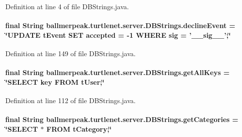Definition at line 4 of file D\-B\-Strings.\-java.

\hypertarget{classballmerpeak_1_1turtlenet_1_1server_1_1DBStrings_a17aab2fc0a6a4f06d268a67e4e7104d4}{
\paragraph[{decline\-Event}]{\setlength{\rightskip}{0pt plus 5cm}final String ballmerpeak.\-turtlenet.\-server.\-D\-B\-Strings.\-decline\-Event = \char`\"{}U\-P\-D\-A\-T\-E t\-Event S\-E\-T accepted = -\/1 W\-H\-E\-R\-E sig = '\-\_\-\-\_\-sig\-\_\-\-\_\-';\char`\"{}\hspace{0.3cm}{\ttfamily [static]}}}\label{classballmerpeak_1_1turtlenet_1_1server_1_1DBStrings_a17aab2fc0a6a4f06d268a67e4e7104d4}


Definition at line 149 of file D\-B\-Strings.\-java.

\hypertarget{classballmerpeak_1_1turtlenet_1_1server_1_1DBStrings_a421524524ae9aecc5f05c4a087a8a3b9}{
\paragraph[{get\-All\-Keys}]{\setlength{\rightskip}{0pt plus 5cm}final String ballmerpeak.\-turtlenet.\-server.\-D\-B\-Strings.\-get\-All\-Keys = \char`\"{}S\-E\-L\-E\-C\-T key F\-R\-O\-M t\-User;\char`\"{}\hspace{0.3cm}{\ttfamily [static]}}}\label{classballmerpeak_1_1turtlenet_1_1server_1_1DBStrings_a421524524ae9aecc5f05c4a087a8a3b9}


Definition at line 112 of file D\-B\-Strings.\-java.

\hypertarget{classballmerpeak_1_1turtlenet_1_1server_1_1DBStrings_abe38c9de113b63c18b1e7083e8b1af6f}{
\paragraph[{get\-Categories}]{\setlength{\rightskip}{0pt plus 5cm}final String ballmerpeak.\-turtlenet.\-server.\-D\-B\-Strings.\-get\-Categories = \char`\"{}S\-E\-L\-E\-C\-T $\ast$ F\-R\-O\-M t\-Category;\char`\"{}\hspace{0.3cm}{\ttfamily [static]}}}\label{classballmerpeak_1_1turtlenet_1_1server_1_1DBStrings_abe38c9de113b63c18b1e7083e8b1af6f}


